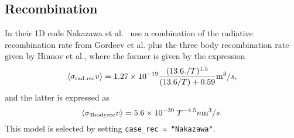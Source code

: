 \documentclass[amsmath,amssymb,a4]{revtex4}
\begin{document}
\subsection{Recombination}

In their 1D code Nakazawa et al.~\cite{nakazawa2000} use a combination of the radiative recombination rate from Gordeev et al. plus the three body recombination rate given by Hinnov et al., where the former is given by the expression~\cite{gordeev1977}
\begin{equation}\label{radiative_recombination}
    \langle\sigma_{\rm rad.rec} v\rangle = 1.27 \times 10^{-19} {(13.6./T)^{1.5} \over (13.6/T) + 0.59} {\rm m}^3 / s,
\end{equation}
and the latter is expressed as~\cite{hinnov1962}
\begin{equation}\label{three_body_recombination}
    \langle\sigma_{\rm 3bodyrec} v\rangle = 5.6 \times 10^{-39} \; T^{-4.5} n {\rm m}^3 / s.
\end{equation}
This model is selected by setting {\tt case\_rec = "Nakazawa"}.
\end{document}
